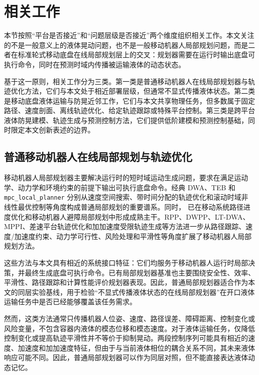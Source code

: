 \section{相关工作}

本节按照“平台是否接近”和“问题层级是否接近”两个维度组织相关工作。本文关注的不是一般意义上的液体晃动问题，也不是一般移动机器人局部规划问题，而是二者在标准轮式移动底盘在线局部规划层上的交叉：规划器需要在运行时输出底盘可执行命令，同时在预测时域内传播被运输液体的动态状态。

基于这一原则，相关工作分为三类。第一类是普通移动机器人在线局部规划器与轨迹优化方法，它们与本文处于相近部署层级，但通常不显式传播液体状态。第二类是移动底盘液体运输与防晃近邻工作，它们与本文共享物理任务，但多数属于固定路径、速度剖面、离线轨迹优化、给定轨迹跟踪或特殊平台控制。第三类是跨平台液体防晃建模、轨迹生成与预测控制方法，它们提供低阶建模和预测控制基础，同时限定本文创新表述的边界。

\subsection{普通移动机器人在线局部规划与轨迹优化}

移动机器人局部规划器主要解决运行时的短时域运动生成问题，要求在满足运动学、动力学和环境约束的前提下输出可执行底盘命令。经典 DWA、TEB 和 \texttt{mpc\_local\_planner} 分别从速度空间搜索、带时间分配的轨迹优化和滚动时域非线性最优控制等角度构成普通局部规划的重要谱系\cite{D15_Fox1997,D16_Rosmann2017,D17_Rosmann2021}。同时，\MPCC{} 已在移动系统路径进度优化和移动机器人避障局部规划中形成成熟主干\cite{D19_Liniger2015,D20_Brito2019}。RPP、DWPP、LT-DWA、MPPI、差速平台轨迹优化和加加速度受限轨迹生成等方法进一步从路径跟踪、速度/加速度约束、动力学可行性、风险处理和平滑性等角度扩展了移动机器人局部规划方法\cite{D01_Macenski2023,D22_Ohnishi2026,D02_Jian2023,D06_Williams2017,D07_Trevisan2025,D03_Zhang2025,D13_Berscheid2021}。

这些方法与本文具有相近的系统接口特征：它们均服务于移动机器人运行时局部决策，并最终生成底盘可执行命令。已有局部规划器基准也主要围绕安全性、效率、平滑性、路径跟踪和计算性能评价规划器表现\cite{D21_Wen2021}。因此，普通局部规划器适合作为本文的同层实验基线，用于检验“不显式传播液体状态的在线局部规划器”在开口液体运输任务中是否已经能够覆盖该任务需求。

然而，这类方法通常只传播机器人位姿、速度、路径误差、障碍距离、控制变化或风险变量，不包含容器内液体的模态位移和模态速度。对于液体运输任务，仅降低控制变化或提高轨迹平滑性并不等价于抑制晃动。两段控制序列可能具有相近的速度、加速度和加加速度特征，但由于与当前液体相位的耦合关系不同，其未来液体响应可能不同。因此，普通局部规划器可以作为同层对照，但不能直接表达液体动态记忆。

